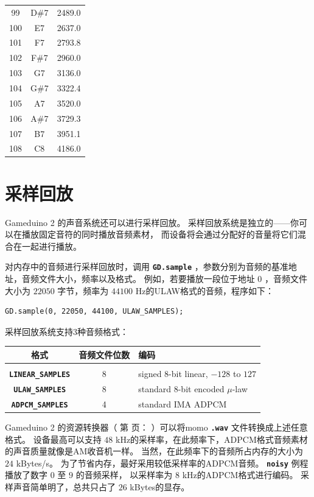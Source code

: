 \documentclass[10pt]{book}
\newcommand{\gdtwo}{Gameduino 2 }
\newcommand{\mach}[1]{\texttt{\textbf{#1}}}
\newcommand{\xref}[1]{第 \pageref{#1} 页：\textit{\nameref{#1}}}
\begin{document}
\begin{CJK}{UTF8}{gkai}
\begin{spacing}{0.99}
\begin{supertabular}{ccc}
99  & D\#7 & 2489.0 \\
100 & E7  & 2637.0 \\
101 & F7  & 2793.8 \\
102 & F\#7 & 2960.0 \\
103 & G7  & 3136.0 \\
104 & G\#7 & 3322.4 \\
105 & A7  & 3520.0 \\
106 & A\#7 & 3729.3 \\
107 & B7  & 3951.1 \\
108 & C8  & 4186.0 \\
\end{supertabular}
\end{spacing}
\onecolumn
\normalsize

\section{采样回放}

\gdtwo 的声音系统还可以进行采样回放。
采样回放系统是独立的——你可以在播放固定音符的同时播放音频素材，
而设备将会通过分配好的音量将它们混合在一起进行播放。

对内存中的音频进行采样回放时，调用 \mach{GD.sample} ，参数分别为音频的基准地址，音频文件大小，频率以及格式。
例如，若要播放一段位于地址 $0$ ，音频文件大小为 $22050$ 字节，频率为 $44100$ Hz的ULAW格式的音频，程序如下：

\begin{framed}
\begin{verbatim}
GD.sample(0, 22050, 44100, ULAW_SAMPLES);
\end{verbatim}
\end{framed}

采样回放系统支持3种音频格式：

\vspace{10pt}
\begin{tabular}{ccl}
格式 & 音频文件位数 & 编码 \\
\hline \\
\mach{LINEAR\_SAMPLES} & 8 & signed $8$-bit linear, $-128$ to $127$ \\
\mach{ULAW\_SAMPLES} & 8 & standard $8$-bit encoded $\mu$-law \\
\mach{ADPCM\_SAMPLES} & 4 & standard IMA ADPCM \\
\end{tabular}
\vspace{10pt}

\gdtwo 的资源转换器（ \xref{assets} ）可以将momo \mach{.wav} 文件转换成上述任意格式。
设备最高可以支持 $48$ kHz的采样率，在此频率下，ADPCM格式音频素材的声音质量就像是AM收音机一样。
当然，在此频率下的音频所占内存的大小为 $24$ kBytes/s。
为了节省内存，最好采用较低采样率的ADPCM音频。 \mach{noisy} 例程播放了数字 $0$ 至 $9$ 的音频采样，
以采样率为 $8$ kHz的ADPCM格式进行编码。
采样声音简单明了，总共只占了 $26$ kBytes的显存。


\end{CJK}
\end{document}
